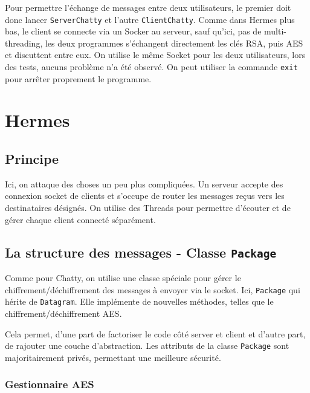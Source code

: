 \documentclass{article}
\begin{document}
Pour permettre l'échange de messages entre deux utilisateurs, le premier doit donc lancer \texttt{ServerChatty} et l'autre 
\texttt{ClientChatty}. Comme dans Hermes plus bas, le client se connecte via un Socker au serveur, sauf qu'ici, pas de 
multi-threading, les deux programmes s'échangent directement les clés RSA, puis AES et discuttent entre eux. 
On utilise le même Socket pour les deux utilisateurs, lors des tests, aucuns problème n'a été observé. 
On peut utiliser la commande \texttt{exit} pour arrêter proprement le programme. 

\newpage

\section{Hermes}

\subsection{Principe}

Ici, on attaque des choses un peu plus compliquées. 
Un serveur accepte des connexion socket de clients et s'occupe de router les messages reçus vers les destinataires désignés. 
On utilise des Threads pour permettre d'écouter et de gérer chaque client connecté séparément. 


\subsection{La structure des messages - Classe \texttt{Package}}

Comme pour Chatty, on utilise une classe spéciale pour gérer le chiffrement/déchiffrement des messages à envoyer via le socket.
Ici, \texttt{Package} qui hérite de \texttt{Datagram}. Elle implémente de nouvelles méthodes, telles que le chiffrement/déchiffrement AES. 

Cela permet, d'une part de factoriser le code côté server et client et d'autre part, de rajouter une couche d'abstraction. 
Les attributs de la classe \texttt{Package} sont majoritairement privés, permettant une meilleure sécurité. 

\subsubsection{Gestionnaire AES}
\end{document}
